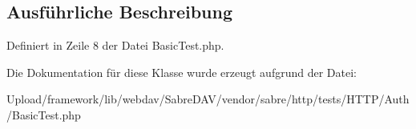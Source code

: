 \subsection{Ausführliche Beschreibung}


Definiert in Zeile 8 der Datei Basic\+Test.\+php.



Die Dokumentation für diese Klasse wurde erzeugt aufgrund der Datei\+:\begin{DoxyCompactItemize}
\item 
Upload/framework/lib/webdav/\+Sabre\+D\+A\+V/vendor/sabre/http/tests/\+H\+T\+T\+P/\+Auth/Basic\+Test.\+php\end{DoxyCompactItemize}
